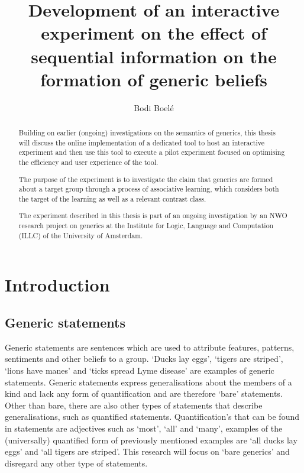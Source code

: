 \documentclass[twoside]{uva-inf-bachelor-thesis}
\title{Development of an interactive experiment on the effect of sequential information on the formation of generic beliefs}
\author{Bodi Boelé}
\theoremstyle{definition}
\begin{document}
\maketitle

\begin{abstract}
Building on earlier (ongoing) investigations on the semantics of generics, this thesis will discuss the online implementation of a dedicated tool to host an interactive experiment and then use this tool to execute a pilot experiment focused on optimising the efficiency and user experience of the tool.

The purpose of the experiment is to investigate the claim that generics are formed about a target group through a process of associative learning, which considers both the target of the learning as well as a relevant contrast class.

The experiment described in this thesis is part of an ongoing investigation by an NWO research project on generics at the Institute for Logic, Language and Computation (ILLC) of the University of Amsterdam.
\end{abstract}

\tableofcontents

\chapter{Introduction}
\section{Generic statements}
Generic statements are sentences which are used to attribute features, patterns, sentiments and other beliefs to a group.
`Ducks lay eggs', `tigers are striped', `lions have manes' and `ticks spread Lyme disease' are examples of generic statements. Generic statements express generalisations about the members of a kind and lack any form of quantification and are therefore `bare' statements. Other than bare, there are also other types of statements that describe generalisations, such as quantified statements. Quantification's that can be found in statements are adjectives such as `most', `all' and `many', examples of the (universally) quantified form of previously mentioned examples are `all ducks lay eggs' and `all tigers are striped'. This research will focus on `bare generics' and disregard any other type of statements.
\end{document}
